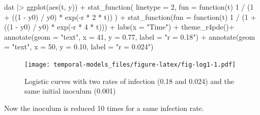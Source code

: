 \documentclass[
  letterpaper,
]{book}
\newenvironment{Shaded}{\begin{snugshade}}{\end{snugshade}}
\newcommand{\AttributeTok}[1]{\textcolor[rgb]{0.40,0.45,0.13}{#1}}
\newcommand{\ControlFlowTok}[1]{\textcolor[rgb]{0.00,0.23,0.31}{#1}}
\newcommand{\DecValTok}[1]{\textcolor[rgb]{0.68,0.00,0.00}{#1}}
\newcommand{\FloatTok}[1]{\textcolor[rgb]{0.68,0.00,0.00}{#1}}
\newcommand{\FunctionTok}[1]{\textcolor[rgb]{0.28,0.35,0.67}{#1}}
\newcommand{\NormalTok}[1]{\textcolor[rgb]{0.00,0.23,0.31}{#1}}
\newcommand{\SpecialCharTok}[1]{\textcolor[rgb]{0.37,0.37,0.37}{#1}}
\newcommand{\StringTok}[1]{\textcolor[rgb]{0.13,0.47,0.30}{#1}}
\begin{document}
\begin{Shaded}
\begin{Highlighting}[]
\NormalTok{dat }\SpecialCharTok{|\textgreater{}}
  \FunctionTok{ggplot}\NormalTok{(}\FunctionTok{aes}\NormalTok{(t, y)) }\SpecialCharTok{+}
  \FunctionTok{stat\_function}\NormalTok{(}
    \AttributeTok{linetype =} \DecValTok{2}\NormalTok{,}
    \AttributeTok{fun =} \ControlFlowTok{function}\NormalTok{(t) }\DecValTok{1} \SpecialCharTok{/}\NormalTok{ (}\DecValTok{1} \SpecialCharTok{+}\NormalTok{ ((}\DecValTok{1} \SpecialCharTok{{-}}\NormalTok{ y0) }\SpecialCharTok{/}\NormalTok{ y0) }\SpecialCharTok{*} \FunctionTok{exp}\NormalTok{(}\SpecialCharTok{{-}}\NormalTok{r }\SpecialCharTok{*} \DecValTok{2} \SpecialCharTok{*}\NormalTok{ t))}
\NormalTok{  ) }\SpecialCharTok{+}
  \FunctionTok{stat\_function}\NormalTok{(}\AttributeTok{fun =} \ControlFlowTok{function}\NormalTok{(t) }\DecValTok{1} \SpecialCharTok{/}\NormalTok{ (}\DecValTok{1} \SpecialCharTok{+}\NormalTok{ ((}\DecValTok{1} \SpecialCharTok{{-}}\NormalTok{ y0) }\SpecialCharTok{/}\NormalTok{ y0) }\SpecialCharTok{*} \FunctionTok{exp}\NormalTok{(}\SpecialCharTok{{-}}\NormalTok{r }\SpecialCharTok{*} \DecValTok{4} \SpecialCharTok{*}\NormalTok{ t))) }\SpecialCharTok{+}
  \FunctionTok{labs}\NormalTok{(}\AttributeTok{x =} \StringTok{"Time"}\NormalTok{) }\SpecialCharTok{+}
\FunctionTok{theme\_r4pde}\NormalTok{()}\SpecialCharTok{+}
  \FunctionTok{annotate}\NormalTok{(}\AttributeTok{geom =} \StringTok{"text"}\NormalTok{, }\AttributeTok{x =} \DecValTok{41}\NormalTok{, }\AttributeTok{y =} \FloatTok{0.77}\NormalTok{, }\AttributeTok{label =} \StringTok{"r = 0.18"}\NormalTok{) }\SpecialCharTok{+}
  \FunctionTok{annotate}\NormalTok{(}\AttributeTok{geom =} \StringTok{"text"}\NormalTok{, }\AttributeTok{x =} \DecValTok{50}\NormalTok{, }\AttributeTok{y =} \FloatTok{0.10}\NormalTok{, }\AttributeTok{label =} \StringTok{"r = 0.024"}\NormalTok{)}
\end{Highlighting}
\end{Shaded}

\begin{figure}

{\centering \texttt{[image: temporal-models\_files/figure-latex/fig-log1-1.pdf]}

}

\caption{\label{fig-log1}Logistic curves with two rates of infection
(0.18 and 0.024) and the same initial inoculum (0.001)}

\end{figure}

Now the inoculum is reduced 10 times for a same infection rate.
\end{document}
